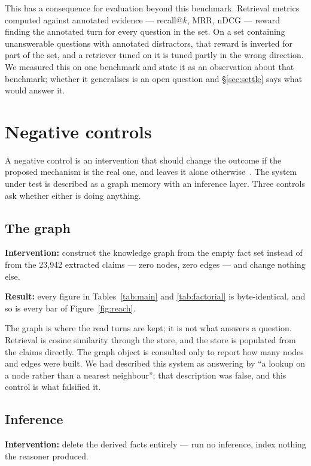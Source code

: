 \documentclass[11pt]{article}
\begin{document}
This has a consequence for evaluation beyond this benchmark. Retrieval metrics
computed against annotated evidence --- recall@$k$, MRR, nDCG --- reward finding
the annotated turn for every question in the set. On a set containing
unanswerable questions with annotated distractors, that reward is inverted for
part of the set, and a retriever tuned on it is tuned partly in the wrong
direction. We measured this on one benchmark and state it as an observation
about that benchmark; whether it generalises is an open question and
\S\ref{sec:settle} says what would answer it.

\section{Negative controls}
\label{sec:controls}

A negative control is an intervention that should change the outcome if the
proposed mechanism is the real one, and leaves it alone
otherwise~\cite{negativecontrol}. The system under test is described as a graph
memory with an inference layer. Three controls ask whether either is doing
anything.

\subsection{The graph}
\label{sec:control-graph}

\textbf{Intervention:} construct the knowledge graph from the empty fact set
instead of from the 23{,}942 extracted claims --- zero nodes, zero edges --- and
change nothing else.

\textbf{Result:} every figure in Tables~\ref{tab:main} and \ref{tab:factorial}
is byte-identical, and so is every bar of Figure~\ref{fig:reach}.

The graph is where the read turns are kept; it is not what answers a question.
Retrieval is cosine similarity through the store, and the store is populated
from the claims directly. The graph object is consulted only to report how many
nodes and edges were built. We had described this system as answering by ``a
lookup on a node rather than a nearest neighbour''; that description was false,
and this control is what falsified it.

\subsection{Inference}
\label{sec:control-reason}

\textbf{Intervention:} delete the derived facts entirely --- run no inference,
index nothing the reasoner produced.
\end{document}
